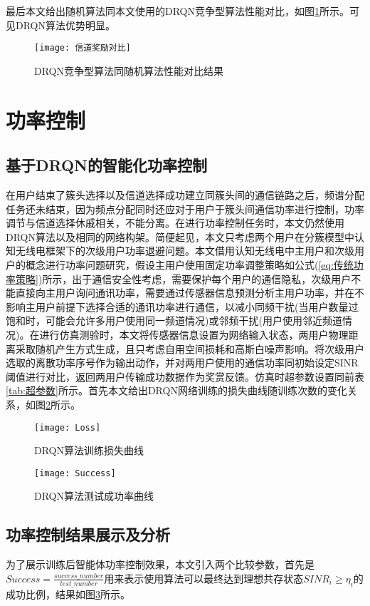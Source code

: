最后本文给出随机算法同本文使用的DRQN竞争型算法性能对比，如图\ref{fig:信道奖励对比}所示。可见DRQN算法优势明显。
\begin{figure}[htbp]
	\centering
	\texttt{[image: 信道奖励对比]}
	\caption{DRQN竞争型算法同随机算法性能对比结果}
	\label{fig:信道奖励对比}
\end{figure}

\section{功率控制}
\subsection{基于DRQN的智能化功率控制}
在用户结束了簇头选择以及信道选择成功建立同簇头间的通信链路之后，频谱分配任务还未结束，因为频点分配同时还应对于用户于簇头间通信功率进行控制，功率调节与信道选择休戚相关，不能分离。在进行功率控制任务时，本文仍然使用DRQN算法以及相同的网络构架。简便起见，本文只考虑两个用户在分簇模型中认知无线电框架下的次级用户功率退避问题。本文借用认知无线电中主用户和次级用户的概念进行功率问题研究，假设主用户使用固定功率调整策略如公式(\ref{eq:传统功率策略})所示，出于通信安全性考虑，需要保护每个用户的通信隐私，次级用户不能直接向主用户询问通讯功率，需要通过传感器信息预测分析主用户功率，并在不影响主用户前提下选择合适的通讯功率进行通信，以减小同频干扰(当用户数量过饱和时，可能会允许多用户使用同一频道情况)或邻频干扰(用户使用邻近频道情况)。在进行仿真测验时，本文将传感器信息设置为网络输入状态，两用户物理距离采取随机产生方式生成，且只考虑自用空间损耗和高斯白噪声影响。将次级用户选取的离散功率序号作为输出动作，并对两用户使用的通信功率同初始设定SINR阈值进行对比，返回两用户传输成功数据作为奖赏反馈。仿真时超参数设置同前表\ref{tab:超参数}所示。首先本文给出DRQN网络训练的损失曲线随训练次数的变化关系，如图\ref{fig:功率loss}所示。

\begin{figure}[htbp]
	\centering
	\texttt{[image: Loss]}
	\caption{DRQN算法训练损失曲线}
	\label{fig:功率loss}
\end{figure}

\begin{figure}[htbp]
	\centering
	\texttt{[image: Success]}
	\caption{DRQN算法测试成功率曲线}
	\label{fig:功率success}
\end{figure}
\subsection{功率控制结果展示及分析}
为了展示训练后智能体功率控制效果，本文引入两个比较参数，首先是$Success=\frac{success\_number}{test\_number}$用来表示使用算法可以最终达到理想共存状态$SINR_{i}\geqslant\eta_{i}$的成功比例，结果如图\ref{fig:功率success}所示。

